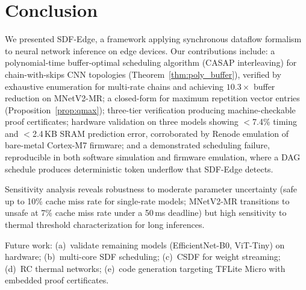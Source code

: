 \documentclass[journal]{IEEEtran}
\begin{document}
\section{Conclusion}

We presented SDF-Edge, a framework applying synchronous dataflow formalism to neural network inference on edge devices.
Our contributions include:
a polynomial-time buffer-optimal scheduling algorithm (CASAP interleaving) for chain-with-skips CNN topologies (Theorem~\ref{thm:poly_buffer}), verified by exhaustive enumeration for multi-rate chains and achieving $10.3\times$ buffer reduction on MNetV2-MR;
a closed-form for maximum repetition vector entries (Proposition~\ref{prop:qmax});
three-tier verification producing machine-checkable proof certificates;
hardware validation on three models showing $<$7.4\% timing and $<$2.4\,KB SRAM prediction error, corroborated by Renode emulation of bare-metal Cortex-M7 firmware;
and a demonstrated scheduling failure, reproducible in both software simulation and firmware emulation, where a DAG schedule produces deterministic token underflow that SDF-Edge detects.

Sensitivity analysis reveals robustness to moderate parameter uncertainty (safe up to 10\% cache miss rate for single-rate models; MNetV2-MR transitions to unsafe at 7\% cache miss rate under a 50\,ms deadline) but high sensitivity to thermal threshold characterization for long inferences.

Future work:
(a)~validate remaining models (EfficientNet-B0, ViT-Tiny) on hardware;
(b)~multi-core SDF scheduling;
(c)~CSDF for weight streaming;
(d)~RC thermal networks;
(e)~code generation targeting TFLite Micro with embedded proof certificates.
\end{document}

